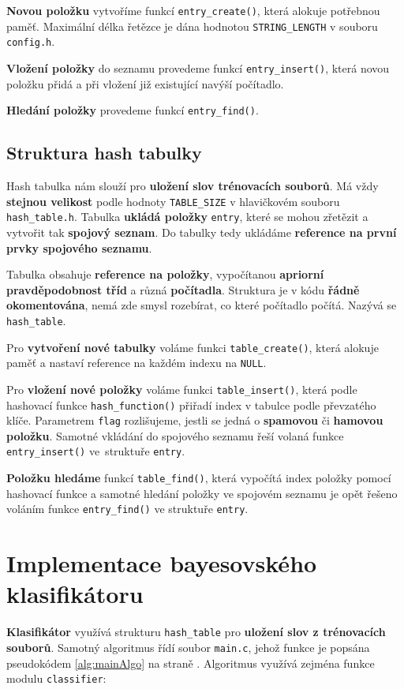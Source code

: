 \documentclass[12pt]{report}
\begin{document}
 		\textbf{Novou položku} vytvoříme funkcí \texttt{entry\_create()}, která alokuje potřebnou paměť. Maximální délka řetězce je dána hodnotou \texttt{STRING\_LENGTH} v souboru \texttt{config.h}.
 		
 		\textbf{Vložení položky} do seznamu provedeme funkcí \texttt{entry\_insert()}, která novou položku přidá a při vložení již existující navýší počítadlo.
 		
 		\textbf{Hledání položky} provedeme funkcí \texttt{entry\_find()}.
 		 	
 		\subsection{Struktura hash tabulky}
 		Hash tabulka nám slouží pro \textbf{uložení slov trénovacích souborů}. Má vždy \textbf{stejnou velikost} podle hodnoty \texttt{TABLE\_SIZE} v hlavičkovém souboru \texttt{hash\_table.h}. Tabulka \textbf{ukládá položky} \texttt{entry}, které se mohou zřetězit a vytvořit tak \textbf{spojový seznam}. Do tabulky tedy ukládáme \textbf{reference na první prvky spojového seznamu}. 
 		
 		Tabulka obsahuje \textbf{reference na položky}, vypočítanou \textbf{apriorní pravděpodobnost tříd} a různá \textbf{počítadla}. Struktura je v kódu \textbf{řádně okomentována}, nemá zde smysl rozebírat, co které počítadlo počítá. Nazývá se \texttt{hash\_table}.
 		
 		Pro \textbf{vytvoření nové tabulky} voláme funkci \texttt{table\_create()}, která alokuje paměť a nastaví reference na každém indexu na \texttt{NULL}.
 		
 		Pro \textbf{vložení nové položky} voláme funkci \texttt{table\_insert()}, která podle hashovací funkce \texttt{hash\_function()} přiřadí index v tabulce podle převzatého klíče. Parametrem \texttt{flag} rozlišujeme, jestli se jedná o \textbf{spamovou} či \textbf{hamovou položku}. Samotné vkládání do spojového seznamu řeší volaná funkce \texttt{entry\_insert()} ve~struktuře \texttt{entry}.
 
 		\textbf{Položku hledáme} funkcí \texttt{table\_find()}, která vypočítá index položky pomocí hashovací funkce a samotné hledání položky ve spojovém seznamu je opět řešeno voláním funkce \texttt{entry\_find()} ve struktuře \texttt{entry}.
 	
 	\section{Implementace bayesovského klasifikátoru}
 	\textbf{Klasifikátor} využívá strukturu \texttt{hash\_table} pro \textbf{uložení slov z trénovacích souborů}. Samotný algoritmus řídí soubor \texttt{main.c}, jehož funkce je popsána pseudokódem \ref{alg:mainAlgo} na straně \pageref{alg:mainAlgo}. Algoritmus využívá zejména funkce modulu \texttt{classifier}:
 	 	
\end{document}
